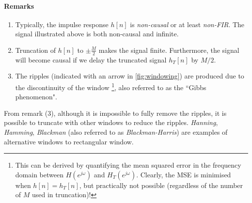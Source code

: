 \begin{ex}{}
\paragraph{Remarks}
\begin{enumerate}
    \item Typically, the impulse response $h[n]$ is  \textit{non-causal} or at least \textit{non-FIR}. The signal illustrated above is both non-causal and infinite.

    \item Truncation of $h[n]$ to $\pm \frac{M}{2}$ makes the signal finite. Furthermore, the signal will become causal if we delay the truncated signal $h_T[n]$ by $M/2$.

    \item The ripples (indicated with an arrow in \autoref{fig:windowing}) are produced due to the discontinuity of the window \footnote{This can be derived by quantifying the mean squared error in the frequency domain between $H(e^{j\omega})$ and $H_T(e^{j\omega})$. Clearly, the MSE is minimised when $h[n]=h_T[n]$, but practically not possible (regardless of the number of $M$ used in truncation)!}, also referred to as the ``Gibbs phenomenon". 
\end{enumerate}
\end{ex}
From remark (3), although it is impossible to fully remove the ripples, it is possible to truncate with other windows to reduce the ripples. \textit{Hanning}, \textit{Hamming}, \textit{Blackman} (also referred to as \textit{Blackman-Harris}) are examples of alternative windows to rectangular window.

